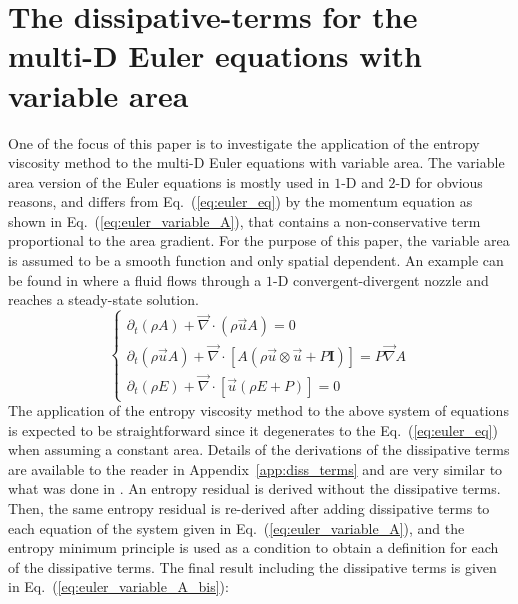 \documentclass[preprint,10pt]{elsarticle}
\renewcommand{\div}{\vec{\nabla}\! \cdot \!}
\newcommand{\grad}{\vec{\nabla}}
\newcommand{\eqt}[1]{Eq.~(\ref{#1})}                     %
\newcommand{\app}[1]{Appendix~\ref{#1}}                   %
\newcommand{\tcr}[1]{\textcolor{red}{#1}}
\begin{document}
\section{The dissipative-terms for the multi-D Euler equations with variable area} \label{sec:var_area_diss_terms}
One of the focus of this paper is to investigate the application of the entropy viscosity method to the multi-D Euler equations with variable area. The variable area version of the Euler equations is mostly used in $1$-D and $2$-D for obvious reasons, and differs from \eqt{eq:euler_eq} by the momentum equation as shown in \eqt{eq:euler_variable_A}, that contains a non-conservative term proportional to the area gradient. For the purpose of this paper, the variable area is assumed to be a smooth function and only spatial dependent. An example can be found in \cite{SEM} where a fluid flows through a $1$-D convergent-divergent nozzle and reaches a steady-state solution.
\begin{equation}
\label{eq:euler_variable_A}
\left\{ 
\begin{array}{lll}
\partial_t \left( \rho A \right) + \div \left( \rho \vec{u} A \right) = 0 \\
\partial_t \left( \rho \vec{u} A \right) + \div \left[A\left( \rho \vec{u} \otimes \vec{u} + P \mathbf{I} \right) \right] = P \grad A \\
\partial_t \left( \rho E \right) + \div \left[ \vec{u} \left( \rho E + P \right) \right] = 0
\end{array}
\right.
\end{equation}
The application of the entropy viscosity method to the above system of equations is expected to be straightforward since it degenerates to the \eqt{eq:euler_eq} when assuming a constant area. Details of the derivations of the dissipative terms are available to the reader in \app{app:diss_terms} and are very similar to what was done in \cite{jlg}. An entropy residual is derived without the dissipative terms. Then, the same entropy residual is re-derived after adding dissipative terms to each equation of the system given in \eqt{eq:euler_variable_A}, and the entropy minimum principle is used as a condition to obtain a definition for each of the dissipative terms. The final result including the dissipative terms is given in \eqt{eq:euler_variable_A_bis}:
\end{document}
